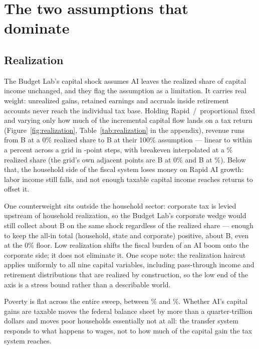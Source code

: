 \section{The two assumptions that dominate}\label{sec:sensitivity}

\subsection{Realization}\label{sec:realization}

The Budget Lab's capital shock assumes AI leaves the realized share of
capital income unchanged, and they flag the assumption as a limitation.
It carries real weight: unrealized gains, retained earnings and accruals
inside retirement accounts never reach the individual tax base. Holding
Rapid~/~proportional fixed and varying only how much of the incremental
capital flow lands on a tax return (Figure~\ref{fig:realization},
Table~\ref{tab:realization} in the appendix), revenue runs from
\genRealZeroRev B at a 0\% realized share to \genRealFullRev B at their
100\% assumption --- linear to within a percent across a grid in
\genRealGridStepPct-point steps, with breakeven interpolated at a
\genRealBreakevenPct\% realized share (the grid's own adjacent points are
\genRealZeroRev B at 0\% and \genRealQuarterRev B at
\genRealGridStepPct\%). Below that, the household side of the fiscal system
loses money on Rapid AI growth: labor income still falls, and not enough
taxable capital income reaches returns to offset it.

One counterweight sits outside the household sector: corporate tax is levied
upstream of household realization, so the Budget Lab's corporate wedge would
still collect about \genTheirRapidCit B on the same shock regardless of the
realized share --- enough to keep the all-in total (household, state and
corporate) positive, about \genRealZeroAllIn B, even at the 0\% floor. Low
realization shifts the fiscal burden of an AI boom onto the corporate side;
it does not eliminate it. One scope note: the realization haircut applies
uniformly to all nine capital variables, including pass-through income and
retirement distributions that are realized by construction, so the low end
of the axis is a stress bound rather than a describable world.

Poverty is flat across the entire sweep, between \genRealPovMinPct\% and
\genRealPovMaxPct\%. Whether AI's capital gains are taxable moves the
federal balance sheet by more than a quarter-trillion dollars and moves poor
households essentially not at all: the transfer system responds to what
happens to wages, not to how much of the capital gain the tax system
reaches.

